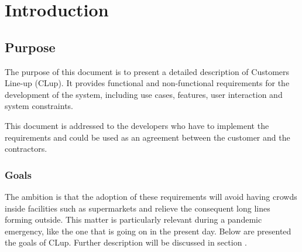\chapter{Introduction}

\section{Purpose}
The purpose of this document is to present a detailed description of Customers Line-up (CLup).
It provides functional and non-functional requirements for the development of the system, including use cases, features, user interaction and system constraints.

This document is addressed to the developers who have to implement the requirements and could be used as an agreement between the customer and the contractors.

\subsection{Goals}\label{intro:goals}
The ambition is that the adoption of these requirements will avoid having crowds inside facilities such as supermarkets and relieve the consequent long lines forming outside. This matter is particularly relevant during a pandemic emergency, like the one that is going on in the present day.\newline
Below are presented the goals of CLup. Further description will be discussed in section .

